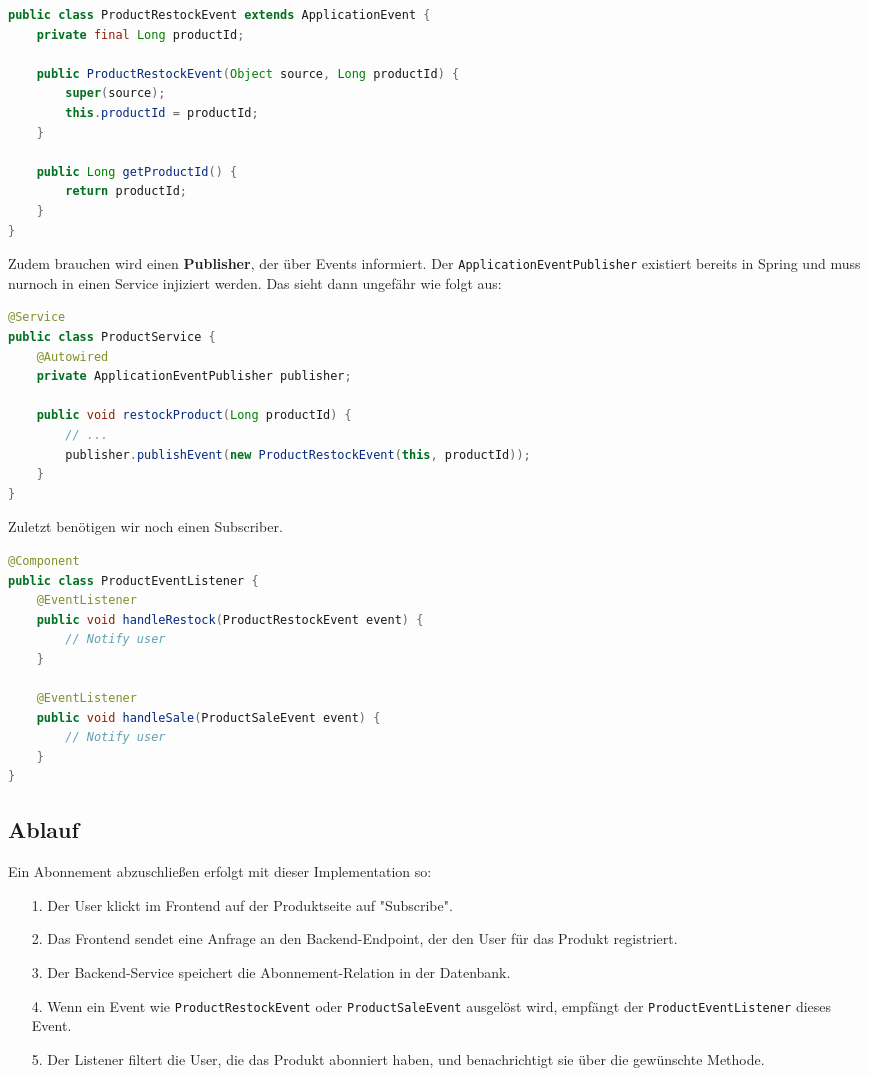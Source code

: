 \documentclass[12pt, a4paper]{scrreprt}
\begin{document}
		\begin{lstlisting}[style=IntelliJPurple, language=Java]
public class ProductRestockEvent extends ApplicationEvent {
	private final Long productId;
	
	public ProductRestockEvent(Object source, Long productId) {
		super(source);
		this.productId = productId;
	}
	
	public Long getProductId() {
		return productId;
	}
}
		\end{lstlisting}
		
		Zudem brauchen wird einen \textbf{Publisher}, der über Events informiert. Der \texttt{ApplicationEventPublisher} existiert bereits in Spring und muss nurnoch in einen Service injiziert werden. Das sieht dann ungefähr wie folgt aus:
		
		\begin{lstlisting}[style=IntelliJPurple, language=Java]
@Service
public class ProductService {
	@Autowired
	private ApplicationEventPublisher publisher;
	
	public void restockProduct(Long productId) {
		// ...
		publisher.publishEvent(new ProductRestockEvent(this, productId));
	}
}
		\end{lstlisting}
		
		Zuletzt benötigen wir noch einen Subscriber.

		\begin{lstlisting}[style=IntelliJPurple, language=Java]
@Component
public class ProductEventListener {
	@EventListener
	public void handleRestock(ProductRestockEvent event) {
		// Notify user
	}
	
	@EventListener
	public void handleSale(ProductSaleEvent event) {
		// Notify user
	}
}
		\end{lstlisting}
		
			\subsection{Ablauf}
		
			Ein Abonnement abzuschließen erfolgt mit dieser Implementation so:
			\begin{itemize}
				\item[1.] Der User klickt im Frontend auf der Produktseite auf "Subscribe".
				\item[2.] Das Frontend sendet eine Anfrage an den Backend-Endpoint, der den User für das Produkt registriert.
				\item[3.] Der Backend-Service speichert die Abonnement-Relation in der Datenbank.
				\item[4.] Wenn ein Event wie \texttt{ProductRestockEvent} oder \texttt{ProductSaleEvent} ausgelöst wird, empfängt der \texttt{ProductEventListener} dieses Event.
				\item[5.] Der Listener filtert die User, die das Produkt abonniert haben, und benachrichtigt sie über die gewünschte Methode.
			\end{itemize}
\end{document}
